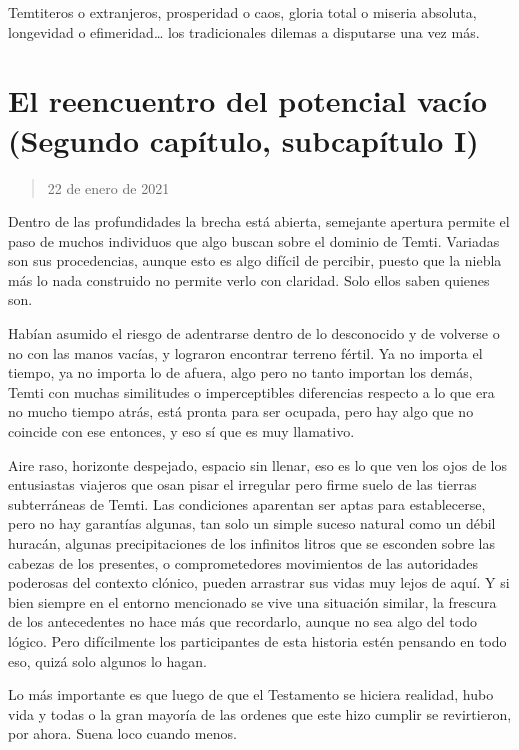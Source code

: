 \documentclass[
  spanish,
]{book}
\begin{document}
Temtiteros o extranjeros, prosperidad o caos, gloria total o miseria absoluta, longevidad o efimeridad\ldots{} los tradicionales dilemas a disputarse una vez más.

\hypertarget{el-reencuentro-del-potencial-vacuxedo-segundo-capuxedtulo-subcapuxedtulo-i}{%
\section{El reencuentro del potencial vacío (Segundo capítulo, subcapítulo I)}\label{el-reencuentro-del-potencial-vacuxedo-segundo-capuxedtulo-subcapuxedtulo-i}}

\begin{quote}
22 de enero de 2021
\end{quote}

Dentro de las profundidades la brecha está abierta, semejante apertura permite el paso de muchos individuos que algo buscan sobre el dominio de Temti. Variadas son sus procedencias, aunque esto es algo difícil de percibir, puesto que la niebla más lo nada construido no permite verlo con claridad. Solo ellos saben quienes son.

Habían asumido el riesgo de adentrarse dentro de lo desconocido y de volverse o no con las manos vacías, y lograron encontrar terreno fértil. Ya no importa el tiempo, ya no importa lo de afuera, algo pero no tanto importan los demás, Temti con muchas similitudes o imperceptibles diferencias respecto a lo que era no mucho tiempo atrás, está pronta para ser ocupada, pero hay algo que no coincide con ese entonces, y eso sí que es muy llamativo.

Aire raso, horizonte despejado, espacio sin llenar, eso es lo que ven los ojos de los entusiastas viajeros que osan pisar el irregular pero firme suelo de las tierras subterráneas de Temti. Las condiciones aparentan ser aptas para establecerse, pero no hay garantías algunas, tan solo un simple suceso natural como un débil huracán, algunas precipitaciones de los infinitos litros que se esconden sobre las cabezas de los presentes, o comprometedores movimientos de las autoridades poderosas del contexto clónico, pueden arrastrar sus vidas muy lejos de aquí. Y si bien siempre en el entorno mencionado se vive una situación similar, la frescura de los antecedentes no hace más que recordarlo, aunque no sea algo del todo lógico. Pero difícilmente los participantes de esta historia estén pensando en todo eso, quizá solo algunos lo hagan.

Lo más importante es que luego de que el Testamento se hiciera realidad, hubo vida y todas o la gran mayoría de las ordenes que este hizo cumplir se revirtieron, por ahora. Suena loco cuando menos.
\end{document}
